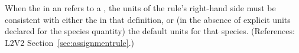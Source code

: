 When the  in an \AssignmentRule refers to a \Species, the
units of the rule's right-hand side must be consistent with either the
 in that \Species definition, or (in the absence of explicit
units declared for the species quantity) the default units for that
species.  (References: L2V2 Section~\ref{sec:assignmentrule}.)
